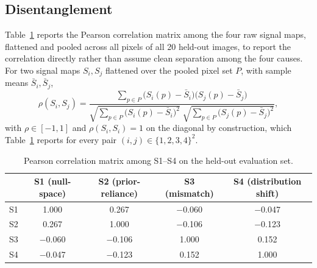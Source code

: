 \documentclass[review]{elsarticle}
\begin{document}
\subsection{Disentanglement}

Table~\ref{tab:disentanglement} reports the Pearson correlation matrix among the four raw signal maps, flattened and pooled across all pixels of all 20 held-out images, to report the correlation directly rather than assume clean separation among the four causes. For two signal maps $S_i, S_j$ flattened over the pooled pixel set $P$, with sample means $\bar{S}_i, \bar{S}_j$,
\begin{equation}
\rho(S_i, S_j) = \frac{\sum_{p \in P} \big(S_i(p) - \bar{S}_i\big)\big(S_j(p) - \bar{S}_j\big)}{\sqrt{\sum_{p \in P} \big(S_i(p) - \bar{S}_i\big)^2} \; \sqrt{\sum_{p \in P} \big(S_j(p) - \bar{S}_j\big)^2}},
\label{eq:pearson}
\end{equation}
with $\rho \in [-1, 1]$ and $\rho(S_i,S_i) = 1$ on the diagonal by construction, which Table~\ref{tab:disentanglement} reports for every pair $(i,j) \in \{1,2,3,4\}^2$.

\begin{table}[h]
\centering
\caption{Pearson correlation matrix among S1–S4 on the held-out evaluation set.}
\label{tab:disentanglement}
\small
\begin{tabular}{lcccc}
\toprule
 & S1 (null-space) & S2 (prior-reliance) & S3 (mismatch) & S4 (distribution shift) \\
\midrule
S1 & 1.000 & 0.267 & $-$0.060 & $-$0.047 \\
S2 & 0.267 & 1.000 & $-$0.106 & $-$0.123 \\
S3 & $-$0.060 & $-$0.106 & 1.000 & 0.152 \\
S4 & $-$0.047 & $-$0.123 & 0.152 & 1.000 \\
\bottomrule
\end{tabular}
\end{table}
\end{document}
